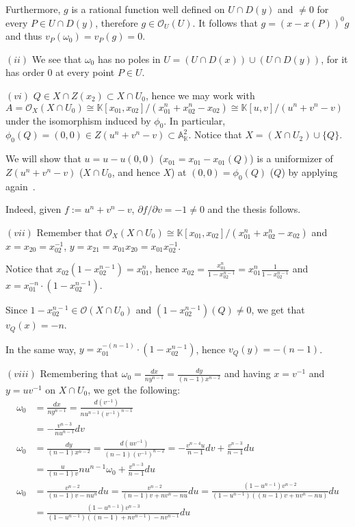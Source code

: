 \documentclass{article}
\newcommand{\numberset}{\mathbb}
\newcommand{\K}{\numberset{K}}
\newcommand{\A}{\mathbb{A}}
\begin{document}
Furthermore, $g$ is a rational function well defined on $U\cap D(y)$ and $\neq 0$ for every $P\in U\cap D(y)$, therefore $g\in\mathcal{O}_U(U)$. It follows that $g=(x-x(P))^0g$ and thus $v_P(\omega_0)=v_P(g)=0$.

$(ii)$ We see that $\omega_0$ has no poles in $U=(U\cap D(x))\cup(U\cap D(y))$, for it has order 0 at every point $P\in U$.

$(vi)$ $Q\in X\cap Z(x_2)\subset X\cap U_0$, hence we may work with $A=\mathcal{O}_X(X\cap U_0)\cong\K[x_{01},x_{02}]/(x_{01}^n+x_{02}^n-x_{02})\cong\K[u,v]/(u^n+v^n-v)$ under the isomorphism induced by $\phi_0$. In particular, $\phi_0(Q)=(0,0)\in Z(u^n+v^n-v)\subset\A^2_{\K}$. Notice that $X=(X\cap U_2)\cup\{Q\}$.

We will show that $u=u-u(0,0)$ ($x_{01}=x_{01}-x_{01}(Q)$) is a uniformizer of $Z(u^n+v^n-v)$ ($X\cap U_0$, and hence $X$) at $(0,0)=\phi_0(Q)$ ($Q$) by applying again~\cite[ex. 7.9.10]{edix}.

Indeed, given $f:=u^n+v^n-v$, $\partial f/\partial v=-1\neq 0$ and the thesis follows.

$(vii)$ Remember that $\mathcal{O}_X(X\cap U_0)\cong\K[x_{01},x_{02}]/(x_{01}^n+x_{02}^n-x_{02})$ and $x=x_{20}=x_{02}^{-1}$, $y=x_{21}=x_{01}x_{20}=x_{01}x_{02}^{-1}$.

Notice that $x_{02}(1-x_{02}^{n-1})=x_{01}^n$, hence $x_{02}=\frac{x_{01}^n}{1-x_{02}^{n-1}}=x_{01}^n\frac{1}{1-x_{02}^{n-1}}$ and $x=x_{01}^{-n}\cdot(1-x_{02}^{n-1})$.

Since $1-x_{02}^{n-1}\in\mathcal{O}(X\cap U_0)$ and $(1-x_{02}^{n-1})(Q)\neq 0$, we get that $v_Q(x)=-n$.

In the same way, $y=x_{01}^{-(n-1)}\cdot(1-x_{02}^{n-1})$, hence $v_Q(y)=-(n-1)$.

$(viii)$ Remembering that $\omega_0=\frac{dx}{ny^{n-1}}=\frac{dy}{(n-1)x^{n-2}}$ and having $x=v^{-1}$ and $y=uv^{-1}$ on $X\cap U_0$, we get the following:
\begin{align*}
  \omega_0 &=\frac{dx}{ny^{n-1}}=\frac{d(v^{-1})}{nu^{n-1}(v^{-1})^{n-1}} \\
  & = -\frac{v^{n-3}}{nu^{n-1}}dv \\
  \omega_0 &=\frac{dy}{(n-1)x^{n-2}}=\frac{d(uv^{-1})}{(n-1)(v^{-1})^{n-2}}=-\frac{v^{n-4}u}{n-1}dv+\frac{v^{n-3}}{n-1}du \\
  & =\frac{u}{(n-1)v}nu^{n-1}\omega_0+\frac{v^{n-3}}{n-1}du \\
  \omega_0 &=\frac{v^{n-2}}{(n-1)v-nu^n}du=\frac{v^{n-2}}{(n-1)v+nv^n-nu}du=\frac{(1-u^{n-1})v^{n-2}}{(1-u^{n-1})((n-1)v+nv^n-nu)}du \\
  & =\frac{(1-u^{n-1})v^{n-3}}{(1-u^{n-1})((n-1)+nv^{n-1})-nv^{n-1}}du
\end{align*}
\end{document}
